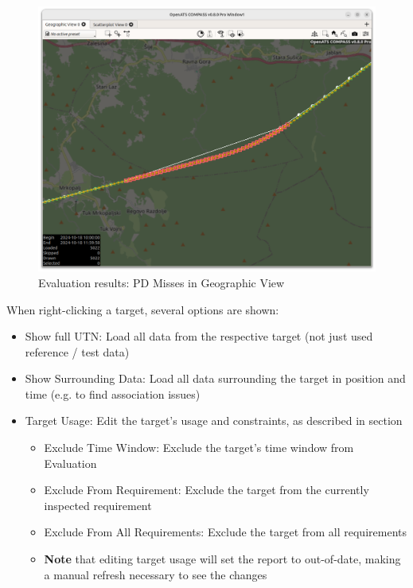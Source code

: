 \begin{figure}[H]
  \hspace*{-2.5cm}
    \includegraphics[width=19cm]{figures/eval_results_single_geoview.png}
  \caption{Evaluation results: PD Misses in Geographic View}
\end{figure}

When right-clicking a target, several options are shown:

\begin{itemize}  
\item Show full UTN: Load all data from the respective target (not just used reference / test data)
\item Show Surrounding Data: Load all data surrounding the target in position and time (e.g. to find association issues)
\item Target Usage: Edit the target's usage and constraints, as described in section 
\begin{itemize} 
  \item Exclude Time Window: Exclude the target's time window from Evaluation
  \item Exclude From Requirement: Exclude the target from the currently inspected requirement
  \item Exclude From All Requirements: Exclude the target from all requirements
  \item \textbf{Note} that editing target usage will set the report to out-of-date, making a manual refresh necessary to see the changes
\end{itemize}
\end{itemize}
\ \\


